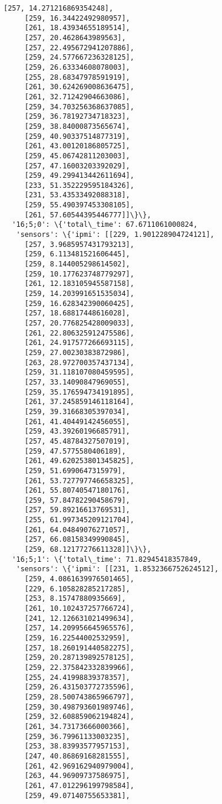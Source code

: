 \documentclass[11pt]{article}
\begin{document}
\begin{tcolorbox}[breakable, size=fbox, boxrule=.5pt, pad at break*=1mm, opacityfill=0]
\begin{Verbatim}[commandchars=\\\{\}]
     [257, 14.271216869354248],
     [259, 16.34422492980957],
     [261, 18.43934655189514],
     [257, 20.4628643989563],
     [257, 22.495672941207886],
     [259, 24.577667236328125],
     [259, 26.63334608078003],
     [255, 28.68347978591919],
     [261, 30.624269008636475],
     [261, 32.71242904663086],
     [259, 34.703256368637085],
     [259, 36.78192734718323],
     [259, 38.84000873565674],
     [259, 40.90337514877319],
     [261, 43.00120186805725],
     [259, 45.06742811203003],
     [257, 47.16003203392029],
     [259, 49.299413442611694],
     [233, 51.352229595184326],
     [231, 53.43533492088318],
     [259, 55.490397453308105],
     [261, 57.60544395446777]]\}\},
  '16;5;0': \{'total\_time': 67.6711061000824,
   'sensors': \{'ipmi': [[229, 1.901228904724121],
     [257, 3.9685957431793213],
     [259, 6.113481521606445],
     [259, 8.144005298614502],
     [259, 10.177623748779297],
     [261, 12.183105945587158],
     [259, 14.203991651535034],
     [259, 16.628342390060425],
     [257, 18.68817448616028],
     [257, 20.776825428009033],
     [261, 22.806325912475586],
     [261, 24.917577266693115],
     [259, 27.00230383872986],
     [263, 28.972700357437134],
     [259, 31.118107080459595],
     [257, 33.14090847969055],
     [259, 35.176594734191895],
     [261, 37.245859146118164],
     [259, 39.31668305397034],
     [261, 41.40449142456055],
     [259, 43.39260196685791],
     [257, 45.48784327507019],
     [259, 47.5775580406189],
     [261, 49.620253801345825],
     [259, 51.6990647315979],
     [261, 53.727797746658325],
     [261, 55.80740547180176],
     [259, 57.84782290458679],
     [257, 59.89216613769531],
     [255, 61.997345209121704],
     [261, 64.04849076271057],
     [257, 66.08158349990845],
     [259, 68.12177276611328]]\}\},
  '16;5;1': \{'total\_time': 71.82945418357849,
   'sensors': \{'ipmi': [[231, 1.8532366752624512],
     [259, 4.0861639976501465],
     [229, 6.105828285217285],
     [253, 8.15747880935669],
     [261, 10.102437257766724],
     [241, 12.126631021499634],
     [257, 14.209956645965576],
     [259, 16.22544002532959],
     [257, 18.260191440582275],
     [259, 20.287139892578125],
     [259, 22.375842332839966],
     [255, 24.41998839378357],
     [259, 26.431503772735596],
     [259, 28.500743865966797],
     [259, 30.498793601989746],
     [259, 32.608859062194824],
     [261, 34.73173666000366],
     [259, 36.79961133003235],
     [253, 38.83993577957153],
     [247, 40.86869168281555],
     [261, 42.969162940979004],
     [263, 44.96909737586975],
     [261, 47.012296199798584],
     [259, 49.07140755653381],

\end{Verbatim}
\end{tcolorbox}
\end{document}
